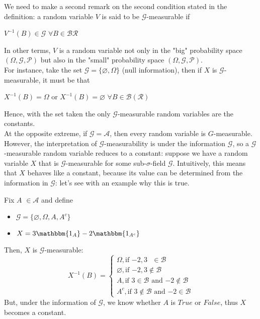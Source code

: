 We need to make a second remark on the second condition stated in the definition: a random variable $V$ is said to be $\mathcal{G}$-measurable if 
\begin{center}
    $V^{-1}(B) \in \mathcal{G}$ $\forall B \in \mathcal{B}\mathcal{R}$
\end{center}
In other terms, $V$ is a random variable not only in the "big" probability space $(\Omega, \mathcal{G}, \mathcal{P})$ but also in the "small" probability space $(\Omega, \mathcal{G}, \mathcal{P})$.
\\
For instance, take the set $\mathcal{G} = \{\varnothing, \Omega\}$ (null information), then if $X$ is $\mathcal{G}$-measurable, it must be that 
\begin{center}
    $X^{-1}(B) = \Omega$ or $X^{-1}(B)=\varnothing$ $\forall B \in \mathcal{B}
(\mathcal{R})$
\end{center}
Hence, with the set taken the only $\mathcal{G}$-measurable random variables are the constants. \\
At the opposite extreme, if $\mathcal{G} = \mathcal{A}$, then every random variable is $G$-measurable.\\ 
However, the interpretation of $\mathcal{G}$-measurability is under the information $\mathcal{G}$, so a $\mathcal{G}$-measurable random variable reduces to a constant: suppose we have a random variable $X$ that is $\mathcal{G}$-measurable for some sub-$\sigma$-field $\mathcal{G}$. Intuitively, this means that $X$ behaves like a constant, because its value can be determined from the information in $\mathcal{G}$: let's see with an example why this is true.
\begin{example}
    Fix $A$ $\in \mathcal{A}$ and define 
    \begin{itemize}
        \item $\mathcal{G}=\{\varnothing, \Omega, A, A^c\}$
        \item $X = 3\mathbbm{1_A}- 2\mathbbm{1_{A^c}}$
    \end{itemize}
Then, $X$ is $\mathcal{G}$-measurable:
\begin{equation}
    X^{-1}(B)= \begin{cases}
        \Omega, \text{if $-2,3$ $\in \mathcal{B}$}\\
        \varnothing, \text{if $-2,3 \notin \mathcal{B}$}\\
        A, \text{if $3 \in \mathcal{B}$ and $-2 \notin \mathcal{B}$}\\
        A^c, \text{if $3 \notin \mathcal{B}$ and $-2 \in \mathcal{B}$}
    \end{cases}
\end{equation}
But, under the information of $\mathcal{G}$, we know whether $A$ is $True$ or $False$, thus $X$ becomes a constant.
\end{example}

